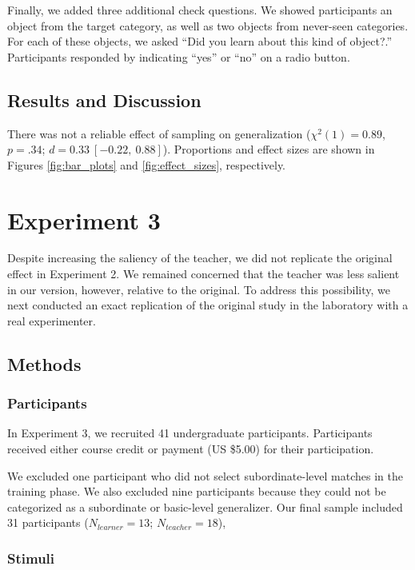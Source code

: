 \documentclass[man]{apa2}
\begin{document}
Finally, we added three additional check questions. We showed participants an object from the target category, as well as two objects from never-seen categories. For each of these objects, we asked ``Did you learn about this kind of object?.'' Participants responded by indicating ``yes'' or ``no'' on a radio button.

\subsection{Results and Discussion}

There was not a reliable effect of sampling on generalization ($\chi^2(1) = 0.89$, $p = .34$; $d = 0.33\ [-0.22,\ 0.88]$). Proportions and effect sizes are shown in Figures \ref{fig:bar_plots} and \ref{fig:effect_sizes}, respectively.

\section{Experiment 3}

Despite increasing the saliency of the teacher, we did not replicate the original effect in Experiment 2. We remained concerned that the teacher was less salient in our version, however, relative to the original. To address this possibility, we next conducted an exact replication of the original study in the laboratory with a real experimenter.

\subsection{Methods}

\subsubsection{Participants} 

In Experiment 3, we recruited 41 undergraduate participants. Participants received either course credit or payment (US \$5.00) for their participation. 

We excluded one participant who did not select subordinate-level matches in the training phase. We also excluded nine participants because they could not be categorized as a subordinate or basic-level generalizer. Our final sample included 31 participants ($N_{learner} = 13$; $N_{teacher} = 18$),

\subsubsection{Stimuli}
\end{document}

